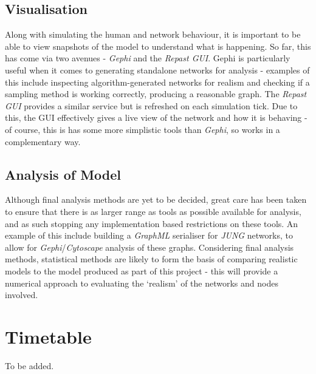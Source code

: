 \documentclass[]{article}
\begin{document}
\subsection{Visualisation}

Along with simulating the human and network behaviour, it is important to be able to view snapshots of the model to understand what is happening. So far, this has come via two avenues - \emph{Gephi} and the \emph{Repast GUI}. Gephi is particularly useful when it comes to generating standalone networks for analysis - examples of this include inspecting algorithm-generated networks for realism and checking if a sampling method is working correctly, producing a reasonable graph. The \emph{Repast GUI} provides a similar service but is refreshed on each simulation tick. Due to this, the GUI effectively gives a live view of the network and how it is behaving - of course, this is has some more simplistic tools than \emph{Gephi}, so works in a complementary way.

\subsection{Analysis of Model}

Although final analysis methods are yet to be decided, great care has been taken to ensure that there is as larger range as tools as possible available for analysis, and as such stopping any implementation based restrictions on these tools. An example of this include building a \emph{GraphML} serialiser for \emph{JUNG} networks, to allow for \emph{Gephi}/\emph{Cytoscape} analysis of these graphs. Considering final analysis methods, statistical methods are likely to form the basis of comparing realistic models to the model produced as part of this project - this will provide a numerical approach to evaluating the `realism' of the networks and nodes involved.

\section{Timetable}
To be added.



\end{document}
